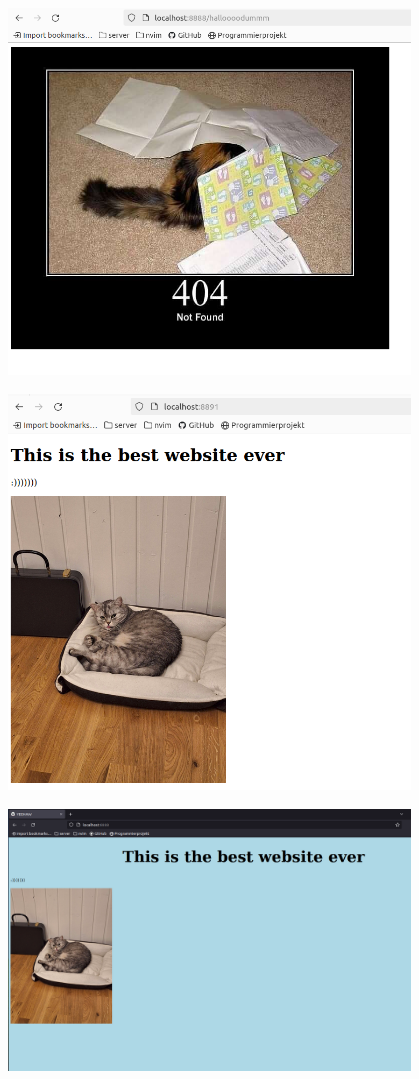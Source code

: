\documentclass[aspectratio=169]{beamer}
\begin{document}
\begin{frame}[c]{}
  \centering
\includegraphics[width=0.8\textwidth,height=\textheight,keepaspectratio]{02_http_cats.png}
\end{frame}

\begin{frame}[c]{}
  \centering
\includegraphics[width=0.8\textwidth,height=\textheight,keepaspectratio]{03_html_mit_bild.png}
\end{frame}

\begin{frame}[c]{}
  \centering
\includegraphics[width=0.8\textwidth,height=\textheight,keepaspectratio]{04_somecss.png}
\end{frame}
\end{document}
